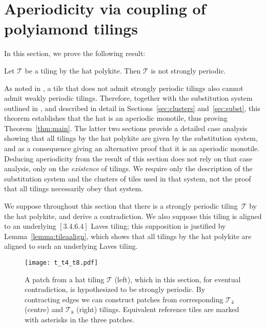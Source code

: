 \section{Aperiodicity via coupling of polyiamond tilings}
\label{sec:coupling}

In this section, we prove the following result:

\begin{theorem}
\label{thm:coupling:aperiodic}
Let $\mathcal{T}$ be a tiling by the hat polykite.  Then $\mathcal{T}$
is not strongly periodic.
\end{theorem}

As noted in , a tile that does not admit strongly
periodic tilings also cannot admit weakly periodic tilings.  Therefore,
together with the substitution system outlined in
, and described in detail in
Sections~\ref{sec:clusters} and~\ref{sec:subst}, this theorem establishes
that the hat is an
aperiodic monotile, thus proving Theorem~\ref{thm:main}.  The latter
two sections provide a detailed case
analysis showing that all tilings by the
hat polykite are given by the substitution system, and as a
consequence giving an alternative proof that it is an aperiodic
monotile.  Deducing aperiodicity from the result of this section does
not rely on that case analysis, only on the \emph{existence} of
tilings. We require only the description of the substitution system
and the clusters of tiles used in that system, not the proof that all
tilings necessarily obey that system.

We suppose throughout this section that there is a strongly periodic
tiling~$\mathcal{T}$ by the hat polykite, and derive a contradiction.
We also suppose this tiling is aligned to an underlying $[3.4.6.4]$
Laves tiling; this supposition is justified by Lemma~\ref{lemma:tileaalign},
which shows that all tilings by the hat polykite are aligned to such an
underlying Laves tiling.

\begin{figure}
\begin{center}
\texttt{[image: t\_t4\_t8.pdf]}
\end{center}
\caption{\label{fig:tt4t8}A patch from a hat tiling $\mathcal{T}$ (left),
	which in this section, for eventual contradiction,  is hypothesized to be strongly periodic.  By 
	contracting edges we can construct patches from corresponding 
	$\mathcal{T}_4$ (centre) and $\mathcal{T}_8$ (right) tilings.  Equivalent
	reference tiles are marked with asterisks in the three patches.}
\end{figure}

